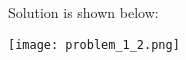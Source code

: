 \documentclass[11pt, letterpaper]{article}
\begin{document}









\begin{solution}{1} 
    Solution is shown below:
    \begin{center}
    \texttt{[image: problem\_1\_2.png]}
    \end{center}

\end{solution}
\end{document}

